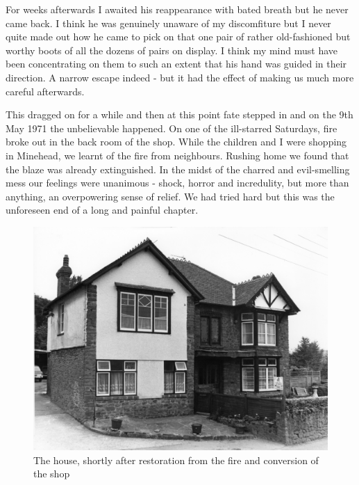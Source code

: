For weeks afterwards I awaited his reappearance with bated breath but he never came back. I think he was genuinely unaware of my discomfiture but I never quite made out how he came to pick on that one pair of rather old-fashioned but worthy boots of all the dozens of pairs on display. I think my mind must have been concentrating on them to such an extent that his hand was guided in their direction. A narrow escape indeed - but it had the effect of making us much more careful afterwards.

This dragged on for a while and then at this point fate stepped in and on the 9th May 1971 the unbelievable happened. On one of the ill-starred Saturdays, fire broke out in the back room of the shop. While the children and I were shopping in Minehead, we learnt of the fire from neighbours. Rushing home we found that the blaze was already extinguished. In the midst of the charred and evil-smelling mess our feelings were unanimous - shock, horror and incredulity, but more than anything, an overpowering sense of relief. We had tried hard but this was the unforeseen end of a long and painful chapter.

\begin{figure}
	 \centering
     \includegraphics[width=1\textwidth]{figures/HillHeadHouse1970}
     \caption{The house, shortly after restoration from the fire and conversion of the shop}
     \label{fig:House1970}
\end{figure}

